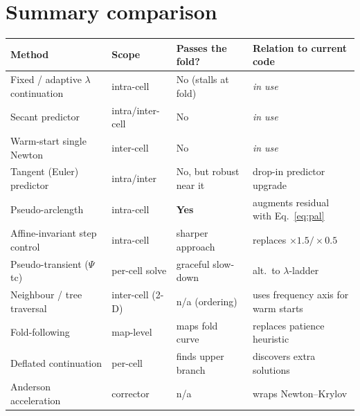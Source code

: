 \documentclass[11pt]{article}
\begin{document}
\section{Summary comparison}
\begin{center}
\small
\begin{tabular}{@{}p{3.5cm}p{2.4cm}p{4.0cm}p{4.3cm}@{}}
\toprule
\textbf{Method} & \textbf{Scope} & \textbf{Passes the fold?} & \textbf{Relation to current code} \\
\midrule
Fixed / adaptive $\lambda$ continuation & intra-cell & No (stalls at fold) & \emph{in use} \\
Secant predictor & intra/inter-cell & No & \emph{in use} \\
Warm-start single Newton & inter-cell & No & \emph{in use} \\
Tangent (Euler) predictor & intra/inter & No, but robust near it & drop-in predictor upgrade \\
Pseudo-arclength & intra-cell & \textbf{Yes} & augments residual with Eq.~\ref{eq:pal} \\
Affine-invariant step control & intra-cell & sharper approach & replaces $\times1.5/\times0.5$ \\
Pseudo-transient ($\Psi$tc) & per-cell solve & graceful slow-down & alt.\ to $\lambda$-ladder \\
Neighbour / tree traversal & inter-cell (2-D) & n/a (ordering) & uses frequency axis for warm starts \\
Fold-following & map-level & maps fold curve & replaces patience heuristic \\
Deflated continuation & per-cell & finds upper branch & discovers extra solutions \\
Anderson acceleration & corrector & n/a & wraps Newton--Krylov \\
\bottomrule
\end{tabular}
\end{center}
\end{document}
